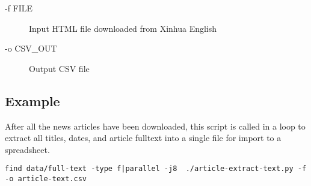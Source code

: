 \begin{description}
	\item [-f FILE] Input HTML file downloaded from Xinhua English
	\item [-o CSV\_OUT] Output CSV file
\end{description}

\subsection{Example}

After all the news articles have been downloaded, this script is called
in a loop to extract all titles, dates, and article fulltext into a
single file for import to a spreadsheet.

\texttt{find data/full-text -type f|parallel -j8 \
./article-extract-text.py -f {} -o article-text.csv}

